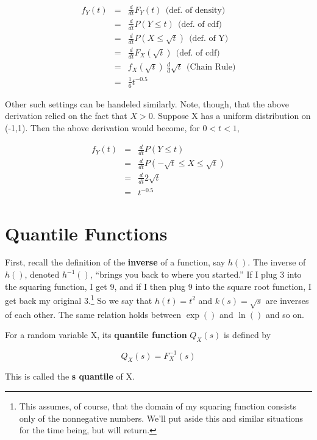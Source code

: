 \begin{eqnarray}
f_Y(t) &=& \frac{d}{dt} F_Y(t) ~~ \textrm{(def. of density)}\\ 
&=& \frac{d}{dt} P(Y \leq t) ~~ \textrm{(def. of cdf)} \\
&=& \frac{d}{dt} P(X \leq \sqrt{t}) ~~ \textrm{(def. of Y)} \\
&=& \frac{d}{dt} F_X(\sqrt{t}) ~~ \textrm{(def. of cdf)} \\
&=& f_X(\sqrt{t}) ~ \frac{d}{d} \sqrt{t} ~~ \textrm{(Chain Rule)} \\
&=& \frac{1}{6} t^{-0.5}
\end{eqnarray}

Other such settings can be handeled similarly.  Note, though, that the
above derivation relied on the fact that $X > 0$.  Suppose X has a
uniform distribution on (-1,1).  Then the above derivation would become,
for $0 < t < 1$,

\begin{eqnarray}
f_Y(t) &=& \frac{d}{dt} P(Y \leq t) \\
&=& \frac{d}{dt} P(-\sqrt{t} \leq X \leq \sqrt{t}) \\
&=& \frac{d}{dt} 2 \sqrt{t} \\
&=& t^{-0.5}
\end{eqnarray}

\section{Quantile Functions}

First, recall the definition of the {\bf inverse} of a function, say
$h()$.  The inverse of $h()$, denoted $h^{-1}()$, ``brings you back to
where you started.'' If I plug 3 into the squaring function, I get 9,
and if I then plug 9 into the square root function, I get back my
original 3.\footnote{This assumes, of course, that the domain of my
squaring function consists only of the nonnegative numbers.  We'll put
aside this and similar situations for the time being, but will return.}
So we say that $h(t) = t^2$ and $k(s) = \sqrt{s}$ are inverses of each
other.  The same relation holds between $\exp()$ and $\ln()$ and so on.

For a random variable X, its {\bf quantile function} $Q_X(s)$ is defined
by

\begin{equation}
Q_X(s) = F_X^{-1}(s)
\end{equation}

This is called the {\bf s quantile} of X.

